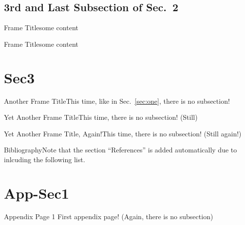 \subsection{3rd and Last Subsection of Sec.\ 2}

\begin{frame}{Frame Title}some content\end{frame}
\begin{frame}{Frame Title}some content\end{frame}



\section{Sec3}\label{sec:three}

\begin{frame}{Another Frame Title}This time, like in Sec.\ \ref{sec:one}, there is no subsection!\end{frame}
\begin{frame}{Yet Another Frame Title}This time, there is no subsection! (Still)\end{frame}
\begin{frame}{Yet Another Frame Title, Again!}This time, there is no subsection! (Still again!)\end{frame}




\begin{frame}{Bibliography}Note that the section ``References'' is added automatically due to inlcuding the following list.\\ \printbibliography[heading=none]\end{frame}


\appendix



\section{App-Sec1}\label{sec:appendixOne}

\begin{frame}{Appendix Page 1}
  First appendix page! (Again, there is no subsection)
\end{frame}





